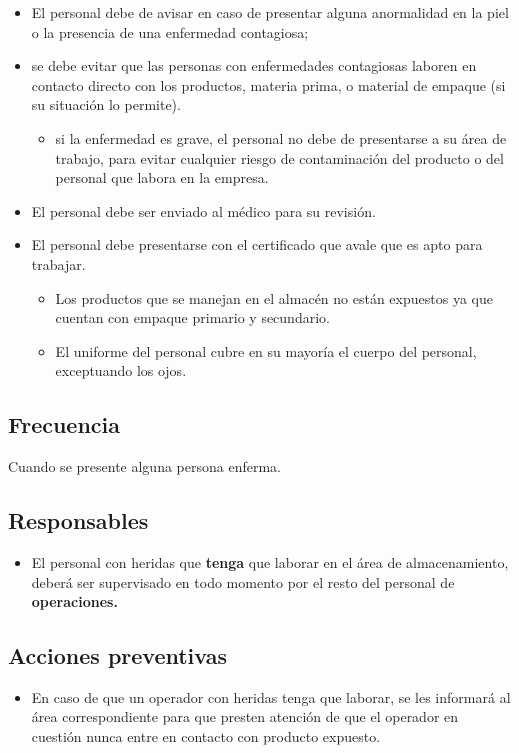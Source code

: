 \begin{itemize}
	\item El personal debe de avisar en caso de presentar alguna anormalidad en la piel o la presencia de una enfermedad contagiosa;
	\item se debe evitar que las personas con enfermedades contagiosas laboren en contacto directo con los productos, materia prima, o material de empaque (si su situación lo permite).
	\begin{itemize}
		\item si la enfermedad es grave, el personal no debe de presentarse a su área de trabajo, para evitar cualquier riesgo de contaminación del producto o del personal que labora en la empresa.
	\end{itemize}
	\item El personal debe ser enviado al médico para su revisión.
	\item El personal debe presentarse con el certificado que avale que es apto para trabajar.
	\begin{itemize}
		\item Los productos que se manejan en el almacén no están expuestos ya que cuentan con empaque primario y secundario.
		\item El uniforme del personal cubre en su mayoría el cuerpo del personal, exceptuando los ojos.
	\end{itemize}
\end{itemize}

\subsection{Frecuencia}

Cuando se presente alguna persona enferma.

\subsection{Responsables}
\begin{itemize}
	\item El personal con heridas que \textbf{tenga} que laborar en el área de almacenamiento, deberá ser supervisado en todo momento por el resto del personal de \textbf{operaciones.}
\end{itemize}

\subsection{Acciones preventivas}
\begin{itemize}
	\item En caso de que un operador con heridas tenga que laborar, se les informará al área correspondiente para que presten atención de que el operador en cuestión nunca entre en contacto con producto expuesto.
\end{itemize}

